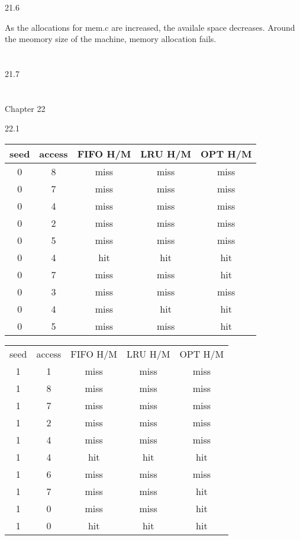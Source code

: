 \documentclass[12pt, a4paper]{article}
\begin{document}
	21.6
	
		As the allocations for mem.c are increased, the availale space decreases. Around the meomory size of the machine, memory allocation fails.\\ \\ \\
	
	21.7 \\ \\ \\
				
		
	
\noindent
Chapter 22

	22.1
	
	\begin{center}
		\begin{tabular}{||c c c c c||} 
 		\hline
		 seed & access & FIFO H/M & LRU H/M & OPT H/M \\ [0.5ex] 
		 \hline
		 0 & 8 & miss & miss & miss \\
		 0 & 7 &miss &miss & miss\\
		 0 & 4 & miss & miss & miss \\
		 0 & 2 &miss &miss & miss\\
		 0 & 5 & miss &miss & miss \\
		 0 & 4 &hit &hit & hit\\
		 0 & 7 &miss &miss & hit\\
		 0 & 3 &miss & miss & miss \\
		 0 & 4 &miss & hit& hit\\
		 0 & 5 &miss &miss & hit\\
		 \hline
		 \end{tabular}
		\end{center}
		 \begin{center}
		\begin{tabular}{||c c c c c||} 
				 seed & access & FIFO H/M & LRU H/M & OPT H/M \\ [0.5ex] 
		 1 & 1 & miss & miss & miss \\
		 1 & 8 &miss &miss & miss\\
		 1 & 7 & miss & miss & miss \\
		 1 & 2 &miss &miss & miss\\
		 1 & 4 & miss &miss & miss \\
		 1 & 4 &hit &hit & hit\\
		 1 & 6 &miss &miss & miss\\
		 1 & 7 &miss & miss & hit \\
		 1 & 0 &miss & miss& hit\\
		 1 & 0 &hit &hit & hit\\
		 \hline
		 \end{tabular}
		\end{center}
\end{document}
